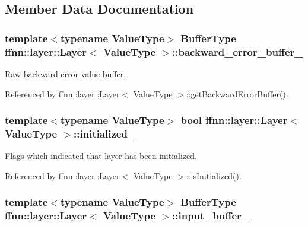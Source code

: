 \subsection{Member Data Documentation}
\hypertarget{classffnn_1_1layer_1_1_layer_a79d676e9b8bd04d1a438266206d4b321}{
\subsubsection[{backward\-\_\-error\-\_\-buffer\-\_\-}]{\setlength{\rightskip}{0pt plus 5cm}template$<$typename Value\-Type$>$ {\bf Buffer\-Type} {\bf ffnn\-::layer\-::\-Layer}$<$ Value\-Type $>$\-::backward\-\_\-error\-\_\-buffer\-\_\-\hspace{0.3cm}{\ttfamily [protected]}}}\label{classffnn_1_1layer_1_1_layer_a79d676e9b8bd04d1a438266206d4b321}


Raw backward error value buffer. 



Referenced by ffnn\-::layer\-::\-Layer$<$ Value\-Type $>$\-::get\-Backward\-Error\-Buffer().

\hypertarget{classffnn_1_1layer_1_1_layer_a4e353c2498ffed566076b3a7fd187e7b}{
\subsubsection[{initialized\-\_\-}]{\setlength{\rightskip}{0pt plus 5cm}template$<$typename Value\-Type$>$ bool {\bf ffnn\-::layer\-::\-Layer}$<$ Value\-Type $>$\-::initialized\-\_\-\hspace{0.3cm}{\ttfamily [protected]}}}\label{classffnn_1_1layer_1_1_layer_a4e353c2498ffed566076b3a7fd187e7b}


Flags which indicated that layer has been initialized. 



Referenced by ffnn\-::layer\-::\-Layer$<$ Value\-Type $>$\-::is\-Initialized().

\hypertarget{classffnn_1_1layer_1_1_layer_ad4b5ac0708d6ada04d62df4fad377f1a}{
\subsubsection[{input\-\_\-buffer\-\_\-}]{\setlength{\rightskip}{0pt plus 5cm}template$<$typename Value\-Type$>$ {\bf Buffer\-Type} {\bf ffnn\-::layer\-::\-Layer}$<$ Value\-Type $>$\-::input\-\_\-buffer\-\_\-\hspace{0.3cm}{\ttfamily [protected]}}}\label{classffnn_1_1layer_1_1_layer_ad4b5ac0708d6ada04d62df4fad377f1a}


